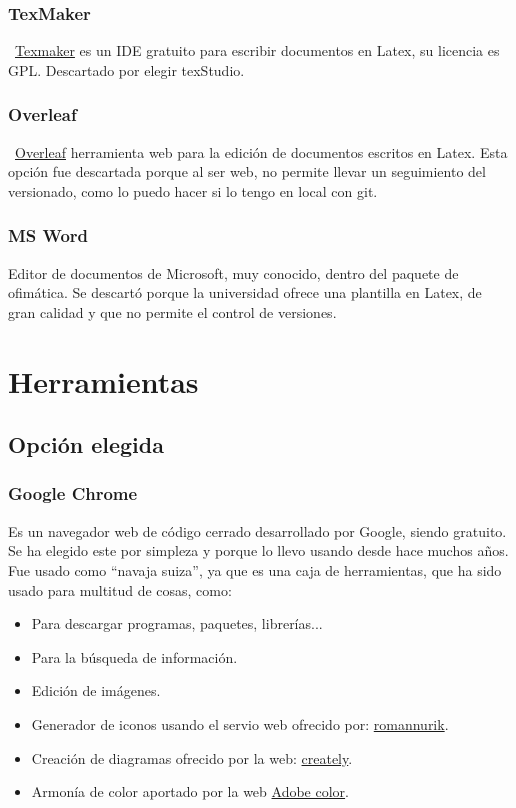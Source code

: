 \subsubsection{TexMaker}\label{textmaker}
~\href{https://www.xm1math.net/texmaker/}{Texmaker} es un IDE gratuito para escribir documentos en Latex, su licencia es GPL. Descartado por elegir texStudio.

\subsubsection{Overleaf}
~\href{https://www.overleaf.com/}{Overleaf} herramienta web para la edición de documentos escritos en Latex. Esta opción fue descartada porque al ser web, no permite llevar un seguimiento del versionado, como lo puedo hacer si lo tengo en local con git.

\subsubsection{MS Word}
Editor de documentos de Microsoft, muy conocido, dentro del paquete de ofimática. Se descartó porque la universidad ofrece una plantilla en Latex, de gran calidad y que no permite el control de versiones.

\section{Herramientas}

\subsection{Opción elegida}

\subsubsection{Google Chrome}
Es un navegador web de código cerrado desarrollado por Google, siendo gratuito. Se ha elegido este por simpleza y porque lo llevo usando desde hace muchos años. Fue usado como ``navaja suiza'', ya que es una caja de herramientas, que ha sido usado para multitud de cosas, como:

\begin{itemize}
	\item Para descargar programas, paquetes, librerías...
	\item Para la búsqueda de información.
	\item Edición de imágenes.
	\item Generador de iconos usando el servio web ofrecido por: \href{https://romannurik.github.io/AndroidAssetStudio}{romannurik}.
	\item Creación de diagramas ofrecido por la web: \href{https://app.creately.com}{creately}.
	\item Armonía de color aportado por la web \href{https://color.adobe.com/es/create/color-wheel}{Adobe color}.
\end{itemize}

